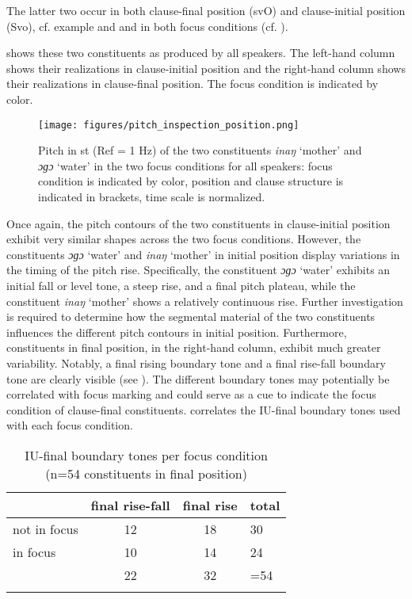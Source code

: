 The latter two  occur in both   clause-final position (svO) and  clause-initial position (Svo), cf. example  and  and in both focus conditions (cf.  ). 


  shows these two constituents as produced by all speakers. The left-hand column shows their realizations  in clause-initial position and the right-hand column shows their realizations in clause-final position. The focus condition is indicated by color.

\begin{figure}
	\texttt{[image: figures/pitch\_inspection\_position.png]}
	\caption{Pitch  in st (Ref = 1 Hz) of the two constituents \textit{inaŋ} `mother' and \textit{ɔɡɔ} `water' in the two focus conditions for all speakers: focus condition is indicated by color, position and clause structure is indicated in brackets, time scale is normalized.}
	\label{pitch:pitch inspection_position}
\end{figure}



Once again, the pitch contours of the two constituents in clause-initial position exhibit very similar shapes across the two focus conditions. However, the constituents \textit{ɔɡɔ} ‘water’ and \textit{inaŋ} `mother' in initial position display variations in the timing of the pitch rise. Specifically, the constituent \textit{ɔɡɔ} ‘water’ exhibits an initial fall or level tone, a steep rise, and a final pitch plateau, while the constituent \textit{inaŋ} `mother' shows a relatively continuous rise. Further investigation is required to determine how the segmental material of the two constituents influences the different pitch contours in initial position. Furthermore, constituents in final position, in the right-hand column, exhibit much greater variability. Notably, a final rising boundary tone and a final rise-fall boundary tone are clearly visible (see  ). The different boundary tones may potentially be correlated with focus marking and could serve as a cue to indicate the focus condition of clause-final constituents.   correlates the IU-final boundary tones used with each focus condition.

\begin{table}
	\caption{IU-final boundary tones per focus condition (n=54 constituents in final position)}
	\label{interaction}
	\begin{tabular}{lccl}
		\lsptoprule
		& final rise-fall  & final rise & total \\
		\midrule
		not in focus  & 12    & 18   &30 \\
		in focus & 10     & 14  & 24\\
		\midrule
		& 22    &  32&=54\\
		\lspbottomrule
	\end{tabular}
\end{table}



